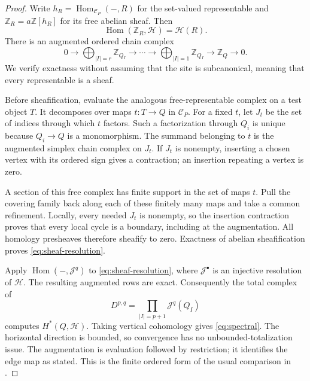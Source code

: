 \documentclass[11pt]{article}
\theoremstyle{definition}
\theoremstyle{remark}
\newcommand{\Z}{\mathbb Z}
\newcommand{\Hom}{\operatorname{Hom}}
\newcommand{\cC}{\mathcal C}
\begin{document}
\begin{proof}
Write $h_R=\Hom_{\cC_P}(-,R)$ for the set-valued representable 
and $\Z_R=a\Z[h_R]$ for its free abelian sheaf. Then
\[
 \Hom(\Z_R,\mathcal H)=\mathcal H(R).
\]
There is an augmented ordered chain complex
\begin{equation}\label{eq:sheaf-resolution}
 0\longrightarrow \bigoplus_{|I|=r}\Z_{Q_I}
 \longrightarrow\cdots\longrightarrow
 \bigoplus_{|I|=1}\Z_{Q_I}
 \longrightarrow\Z_Q\longrightarrow0.
\end{equation}
We verify exactness without assuming that the site is subcanonical, meaning that every representable is a sheaf.

Before sheafification, 
evaluate the analogous free-representable complex on a test object $T$. It decomposes over maps $t:T\to Q$ in $\cC_P$. For a fixed $t$, let $J_t$ be the set of indices through which $t$ factors. 
Such a factorization through $Q_i$ is unique because $Q_i\to Q$ is a monomorphism. The summand belonging to $t$ is the augmented simplex chain complex on $J_t$. If $J_t$ is nonempty, inserting a chosen vertex with its ordered sign gives a contraction; an insertion repeating a vertex is zero.

A section of this free complex has finite support in the set of maps $t$. Pull the covering family back along each of these finitely many maps and take a common refinement. Locally, every needed $J_t$ is nonempty, so the insertion contraction proves that every local cycle is a boundary, including at the augmentation. All homology presheaves therefore sheafify to zero. Exactness of abelian sheafification proves \eqref{eq:sheaf-resolution}.

Apply $\Hom(-,\mathcal J^q)$ to \eqref{eq:sheaf-resolution}, where $\mathcal J^\bullet$ is an injective resolution of $\mathcal H$. The resulting augmented rows are exact. Consequently the total complex of
\[
 D^{p,q}=\prod_{|I|=p+1}\mathcal J^q(Q_I)
\]
computes $H^*(Q,\mathcal H)$. Taking vertical cohomology gives \eqref{eq:spectral}. The horizontal direction is bounded, so convergence has no unbounded-totalization issue. The augmentation is evaluation followed by restriction; it identifies the edge map as stated. This is the finite ordered form of the usual comparison in \cite[Tag 03AZ]{stacks}.
\end{proof}
\end{document}
